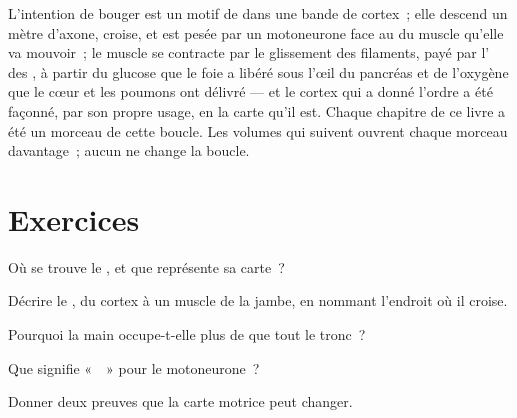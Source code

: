 \begin{remark}\label{rem:g12:brain-and-movement:loop}
L'intention de bouger est un motif de  dans une
bande de cortex~; elle descend un mètre d'axone, croise, et est pesée
par un motoneurone face au  du muscle qu'elle va mouvoir~; le
muscle se contracte par le glissement des filaments, payé par l'
des , à partir du glucose que le foie a libéré sous l'œil
du pancréas et de l'oxygène que le cœur et les poumons ont
délivré --- et le cortex qui a donné l'ordre a été façonné, par son
propre usage, en la carte qu'il est. Chaque chapitre de ce livre a été
un morceau de cette boucle. Les volumes qui suivent ouvrent chaque
morceau davantage~; aucun ne change la boucle.
\end{remark}

\section{Exercices}

\begin{exercise}[$\star$]\label{exo:g12:brain-and-movement:1}
Où se trouve le , et que représente sa carte~?
\end{exercise}

\begin{exercise}[$\star$]\label{exo:g12:brain-and-movement:2}
Décrire le , du cortex à un muscle de la jambe,
en nommant l'endroit où il croise.
\end{exercise}

\begin{exercise}[$\star$]\label{exo:g12:brain-and-movement:3}
Pourquoi la main occupe-t-elle plus de  que tout le
tronc~?
\end{exercise}

\begin{exercise}[$\star$]\label{exo:g12:brain-and-movement:4}
Que signifie «~~» pour le motoneurone~?
\end{exercise}

\begin{exercise}[$\star$]\label{exo:g12:brain-and-movement:5}
Donner deux preuves que la carte motrice peut changer.
\end{exercise}

